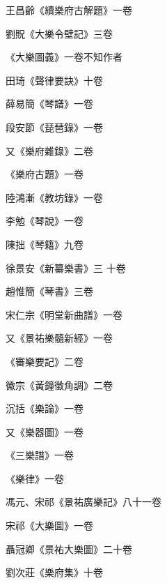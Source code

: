 \begin{pinyinscope}
 王昌齡《續樂府古解題》一卷



 劉貺《大樂令壁記》三卷



 《大樂圖義》一卷不知作者



 田琦《聲律要訣》十卷



 薛易簡《琴譜》一卷



 段安節《琵琶錄》一卷



 又《樂府雜錄》二卷



 《樂府古題》一卷



 陸鴻漸《教坊錄》一卷



 李勉《琴說》一卷



 陳拙《琴籍》九卷



 徐景安《新纂樂書》三
 十卷



 趙惟簡《琴書》三卷



 宋仁宗《明堂新曲譜》一卷



 又《景祐樂髓新經》一卷



 《審樂要記》二卷



 徽宗《黃鐘徵角調》二卷



 沉括《樂論》一卷



 又《樂器圖》一卷



 《三樂譜》一卷



 《樂律》一卷



 馮元、宋祁《景祐廣樂記》八十一卷



 宋祁《大樂圖》一卷



 聶冠卿《景祐大樂圖》二十卷



 劉次莊《樂府集》十卷




\end{pinyinscope}
